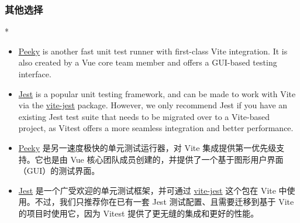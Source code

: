 \begin{paracol}{2}
\subsubsection{其他选择}
\switchcolumn[0]*%
\begin{itemize}
\item
  \href{https://peeky.dev/}{Peeky} is another fast unit test runner with
  first-class Vite integration. It is also created by a Vue core team
  member and offers a GUI-based testing interface.
\item
  \href{https://jestjs.io/}{Jest} is a popular unit testing framework,
  and can be made to work with Vite via the
  \href{https://github.com/sodatea/vite-jest}{vite-jest} package.
  However, we only recommend Jest if you have an existing Jest test
  suite that needs to be migrated over to a Vite-based project, as
  Vitest offers a more seamless integration and better performance.
\end{itemize}
\switchcolumn
\begin{itemize}
\item
  \href{https://peeky.dev/}{Peeky} 是另一速度极快的单元测试运行器，对
  Vite 集成提供第一优先级支持。它也是由 Vue
  核心团队成员创建的，并提供了一个基于图形用户界面（GUI）的测试界面。
\item
  \href{https://jestjs.io/}{Jest} 是一个广受欢迎的单元测试框架，并可通过
  \href{https://github.com/sodatea/vite-jest}{vite-jest} 这个包在 Vite
  中使用。不过，我们只推荐你在已有一套 Jest 测试配置、且需要迁移到基于
  Vite 的项目时使用它，因为 Vitest 提供了更无缝的集成和更好的性能。
\end{itemize}
\end{paracol}

